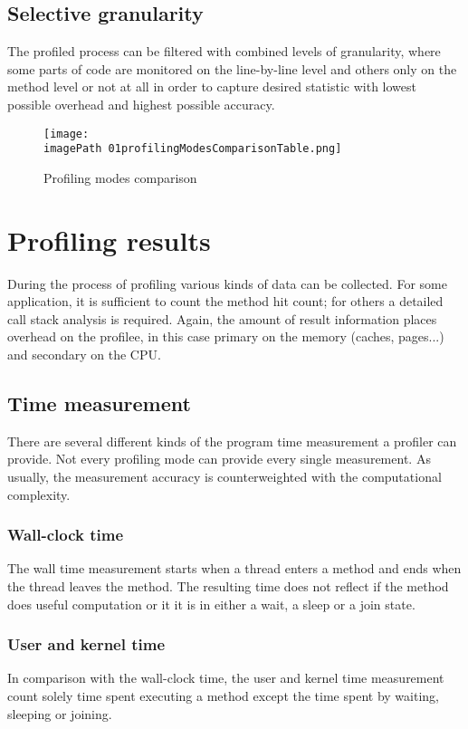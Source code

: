 \subsection{Selective granularity}
The profiled process can be filtered with combined levels of granularity, where some parts of code are monitored on the line-by-line level and others only on the method level or not at all in order to capture desired statistic with lowest possible overhead and highest possible accuracy.

\begin{figure}
	\centering
		\texttt{[image: \\imagePath 01profilingModesComparisonTable.png]}
		\caption{Profiling modes comparison}
	\label{fig:01profilingModesComparisonTable}
\end{figure}


\section{Profiling results}
During the process of profiling various kinds of data can be collected. For some application, it is sufficient to count the method hit count; for others a detailed call stack analysis is required. Again, the amount of result information places overhead on the profilee, in this case primary on the memory (caches, pages...) and secondary on the CPU.

\subsection{Time measurement}
There are several different kinds of the program time measurement a profiler can provide. Not every profiling mode can provide every single measurement. As usually, the measurement accuracy is counterweighted with the computational complexity.

\subsubsection*{Wall-clock time}
The wall time measurement starts when a thread enters a method and ends when the thread leaves the method. The resulting time does not reflect if the method does useful computation or it it is in either a wait, a sleep or a join state.

\subsubsection*{User and kernel time}
In comparison with the wall-clock time, the user and kernel time measurement count solely time spent executing a method except the time spent by waiting, sleeping or joining.

